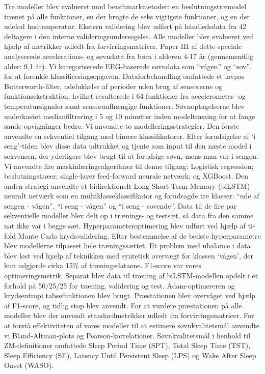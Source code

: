\documentclass[
  9pt,
]{scrbook}
\begin{document}
Tre modeller blev evalueret mod benchmarkmetoder: en beslutningstræmodel
trænet på alle funktioner, en der brugte de seks vigtigste funktioner,
og en der udelod hudtemperatur. Ekstern validering blev udført på
håndledsdata fra 42 deltagere i den interne valideringsundersøgelse.
Alle modeller blev evalueret ved hjælp af metrikker udledt fra
forvirringsmatricer. Paper III af dette speciale analyserede
accelerations- og søvndata fra børn i alderen 4-17 år (gennemsnitlig
alder: 9,1 år). Vi kategoriserede EEG-baserede søvndata som ``vågen'' og
``sov'', for at forenkle klassificeringsopgaven. Dataforbehandling
omfattede et lavpas Butterworth-filter, udelukkelse af perioder uden
brug af sensorerne og funktionsekstraktion, hvilket resulterede i 64
funktioner fra accelerometer- og temperatursignaler samt
sensoruafhængige funktioner. Søvnoptagelserne blev underkastet
medianfiltrering i 5 og 10 minutter inden modeltræning for at fange
sande opvågninger bedre. Vi anvendte to modelleringsstrategier. Den
første anvendte en sekventiel tilgang med binære klassifikatorer. Efter
forudsigelse af `i seng'-tiden blev disse data udtrukket og tjente som
input til den næste model i sekvensen, der yderligere blev brugt til at
forudsige søvn, mens man var i sengen. Vi anvendte fire
maskinlæringsalgoritmer til denne tilgang: Logistisk regression;
beslutningstræer; single-layer feed-forward neurale netværk; og XGBoost.
Den anden strategi anvendte et bidirektionelt Long Short-Term Memory
(biLSTM) neuralt netværk som en multiklasseklassifikator og forudsagde
tre klasser: ``ude af sengen - vågen'', ``i seng - vågen'' og ``i seng -
sovende''. Data til de fire par sekventielle modeller blev delt op i
trænings- og testsæt, så data fra den samme nat ikke var i begge sæt.
Hyperparameteroptimering blev udført ved hjælp af ti-fold Monte Carlo
krydsvalidering. Efter bestemmelse af de bedste hyperparametre blev
modellerne tilpasset hele træningssættet. Et problem med ubalance i data
blev løst ved hjælp af teknikken med syntetisk overvægt for klassen
`vågen', der kun udgjorde cirka 15\% af træningsdataene. F1-score var
vores optimeringsmetrik. Separat blev data til træning af
biLSTM-modellen opdelt i et forhold på 50/25/25 for træning, validering
og test. Adam-optimereren og krydsentropi tabsefunktionen blev brugt.
Præstationen blev overvåget ved hjælp af F1-score, og tidlig stop blev
anvendt. For at vurdere præstationen på alle modeller blev der anvendt
standardmetrikker udledt fra forvirringsmatricer. For at forstå
effektiviteten af vores modeller til at estimere søvnkvalitetsmål
anvendte vi Bland-Altman-plots og Pearson-korrelationer.
Søvnkvalitetsmål i henhold til ZM-definitioner omfattede Sleep Period
Time (SPT), Total Sleep Time (TST), Sleep Efficiency (SE), Latency Until
Persistent Sleep (LPS) og Wake After Sleep Onset (WASO).
\end{document}
